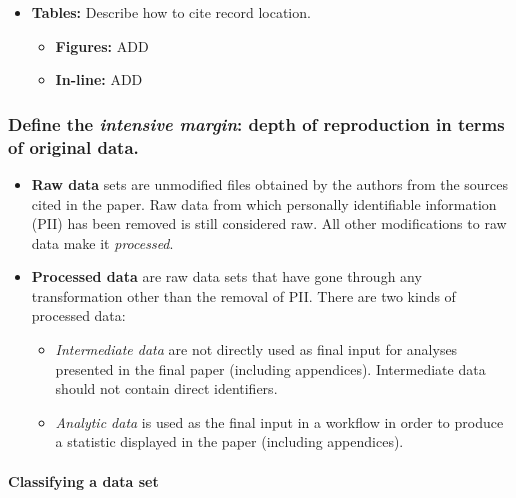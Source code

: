 \documentclass[]{book}
\providecommand{\tightlist}{%
  \setlength{\itemsep}{0pt}\setlength{\parskip}{0pt}}
\let\oldparagraph\paragraph
\renewcommand{\paragraph}[1]{\oldparagraph{#1}\mbox{}}
\begin{document}
\begin{itemize}
\tightlist
\item
  \textbf{Tables:} Describe how to cite record location.

  \begin{itemize}
  \tightlist
  \item
    \textbf{Figures:} ADD\\
  \item
    \textbf{In-line:} ADD
  \end{itemize}
\end{itemize}

\hypertarget{intensive}{%
\subsubsection{\texorpdfstring{Define the \emph{intensive margin}: depth of reproduction in terms of original data.}{Define the intensive margin: depth of reproduction in terms of original data.}}\label{intensive}}

\begin{itemize}
\tightlist
\item
  \textbf{Raw data} sets are unmodified files obtained by the authors from the sources cited in the paper. Raw data from which personally identifiable information (PII) has been removed is still considered raw. All other modifications to raw data make it \emph{processed}.\\
\item
  \textbf{Processed data} are raw data sets that have gone through any transformation other than the removal of PII. There are two kinds of processed data:

  \begin{itemize}
  \tightlist
  \item
    \emph{Intermediate data} are not directly used as final input for analyses presented in the final paper (including appendices). Intermediate data should not contain direct identifiers.\\
  \item
    \emph{Analytic data} is used as the final input in a workflow in order to produce a statistic displayed in the paper (including appendices).
  \end{itemize}
\end{itemize}

\hypertarget{classifying-a-data-set}{%
\paragraph{Classifying a data set}\label{classifying-a-data-set}}
\end{document}

